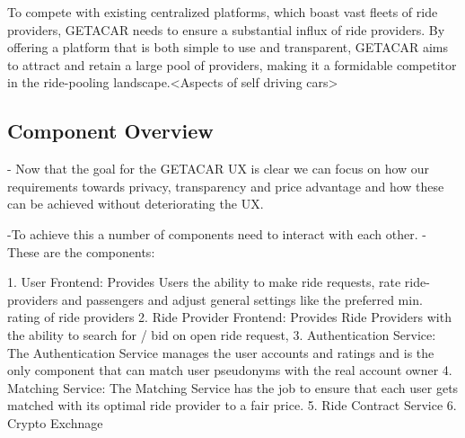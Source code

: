 To compete with existing centralized platforms, which boast vast fleets of ride providers, GETACAR needs to ensure a substantial influx of ride providers. By offering a platform that is both simple to use and transparent, GETACAR aims to attract and retain a large pool of providers, making it a formidable competitor in the ride-pooling landscape.<Aspects of self driving cars>

\subsection{Component Overview}
- Now that the goal for the GETACAR UX is clear we can focus on how our requirements towards privacy, transparency and price advantage and how these can  be achieved without deteriorating the UX.

-To achieve this a number of components need to interact with each other.
- These are the components:

1. User Frontend: Provides Users the ability to make ride requests, rate ride-providers and passengers and adjust general settings like the preferred min. rating of ride providers
2. Ride Provider Frontend: Provides Ride Providers with the ability to search for / bid on open ride request, 
3. Authentication Service: The Authentication Service manages the user accounts and ratings and is the only component that can match user pseudonyms with the real account owner 
4. Matching Service: The Matching Service has the job to ensure that each user gets matched with its optimal ride provider to a fair price. 
5. Ride Contract Service
6. Crypto Exchnage 

